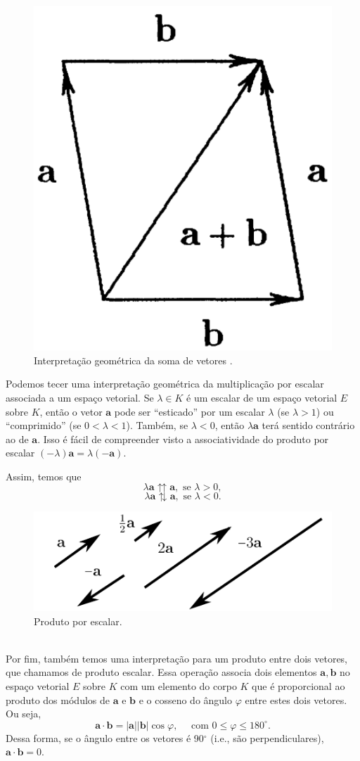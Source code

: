 \documentclass[a4paper,12pt]{report}
\theoremstyle{plain}
\theoremstyle{definition}
\newcommand{\norm}[1]{\left| #1 \right|}
\begin{document}
\begin{figure}[H]
	\begin{center}
		\includegraphics[width=0.22\linewidth]{figures/paralelogram.pdf}
	\end{center}
	\caption{Interpretação geométrica da soma de vetores \cite{lounestoClifford}.}
	\label{fig:paralelogram}
\end{figure}

Podemos tecer uma interpretação geométrica da multiplicação por escalar associada a um espaço vetorial. Se $\lambda\in K$ é um escalar de um espaço vetorial $E$ sobre $K$, então o vetor $\mathbf a$ pode ser ``esticado'' por um escalar $\lambda$ (se $\lambda>1$) ou ``comprimido'' (se $0<\lambda<1$). Também, se $\lambda<0$, então $\lambda \mathbf a$ terá sentido contrário ao de $\mathbf a$. Isso é fácil de compreender visto a associatividade do produto por escalar $(-\lambda)\mathbf a = \lambda(-\mathbf a).$


\begin{minipage}{0.3\linewidth}
	Assim, temos que $$\lambda \mathbf a \upuparrows \mathbf a, \text{ se } \lambda > 0,$$ $$\lambda \mathbf a \updownarrows \mathbf a, \text{ se } \lambda < 0.$$
\end{minipage}
\begin{minipage}{0.7\linewidth}
	\begin{figure}[H]
		\begin{center}
			\includegraphics[width=0.7\linewidth]{figures/scalarProduct.pdf}
		\end{center}
		\caption{Produto por escalar.}
		\label{fig:scalarProduct}
	\end{figure}
\end{minipage}
\\

Por fim, também temos uma interpretação para um produto entre dois vetores, que chamamos de produto escalar. Essa operação associa dois elementos $\mathbf a, \mathbf b$ no espaço vetorial $E$ sobre $K$ com um elemento do corpo $K$ que é proporcional ao produto dos módulos de $\mathbf a$ e $\mathbf b$ e o cosseno do ângulo $\varphi$ entre estes dois vetores. Ou seja, $$\mathbf a \cdot \mathbf b = \norm{\mathbf a}\norm{\mathbf b}\cos \varphi,\quad \text{ com } 0\leq\varphi\leq 180^\circ.$$
Dessa forma, se o ângulo entre os vetores é 90$^\circ$ (i.e., são perpendiculares), $\mathbf a \cdot \mathbf b = 0$.\\
\end{document}
